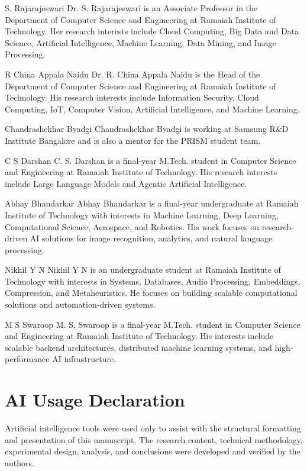 \documentclass{ieeeaccess}
\begin{document}
\clearpage
\begin{IEEEbiography}{S. Rajarajeswari}
Dr. S. Rajarajeswari is an Associate Professor in the Department of Computer Science and Engineering at Ramaiah Institute of Technology. Her research interests include Cloud Computing, Big Data and Data Science, Artificial Intelligence, Machine Learning, Data Mining, and Image Processing.
\end{IEEEbiography}

\begin{IEEEbiography}{R China Appala Naidu}
Dr. R. China Appala Naidu is the Head of the Department of Computer Science and Engineering at Ramaiah Institute of Technology. His research interests include Information Security, Cloud Computing, IoT, Computer Vision, Artificial Intelligence, and Machine Learning.
\end{IEEEbiography}

\begin{IEEEbiography}{Chandrashekhar Byadgi}
Chandrashekhar Byadgi is working at Samsung R\&D Institute Bangalore and is also a mentor for the PRISM student team.
\end{IEEEbiography}

\begin{IEEEbiography}{C S Darshan}
C. S. Darshan is a final-year M.Tech. student in Computer Science and Engineering at Ramaiah Institute of Technology. His research interests include Large Language Models and Agentic Artificial Intelligence.
\end{IEEEbiography}

\begin{IEEEbiography}{Abhay Bhandarkar}
Abhay Bhandarkar is a final-year undergraduate at Ramaiah Institute of Technology with interests in Machine Learning, Deep Learning, Computational Science, Aerospace, and Robotics. His work focuses on research-driven AI solutions for image recognition, analytics, and natural language processing.
\end{IEEEbiography}

\begin{IEEEbiography}{Nikhil Y N}
Nikhil Y N is an undergraduate student at Ramaiah Institute of Technology with interests in Systems, Databases, Audio Processing, Embeddings, Compression, and Metaheuristics. He focuses on building scalable computational solutions and automation-driven systems.
\end{IEEEbiography}

\begin{IEEEbiography}{M S Swaroop}
M. S. Swaroop is a final-year M.Tech. student in Computer Science and Engineering at Ramaiah Institute of Technology. His interests include scalable backend architectures, distributed machine learning systems, and high-performance AI infrastructure.
\end{IEEEbiography}

\section*{AI Usage Declaration}
Artificial intelligence tools were used only to assist with the structural formatting and presentation of this manuscript. The research content, technical methodology, experimental design, analysis, and conclusions were developed and verified by the authors.

\EOD
\end{document}

